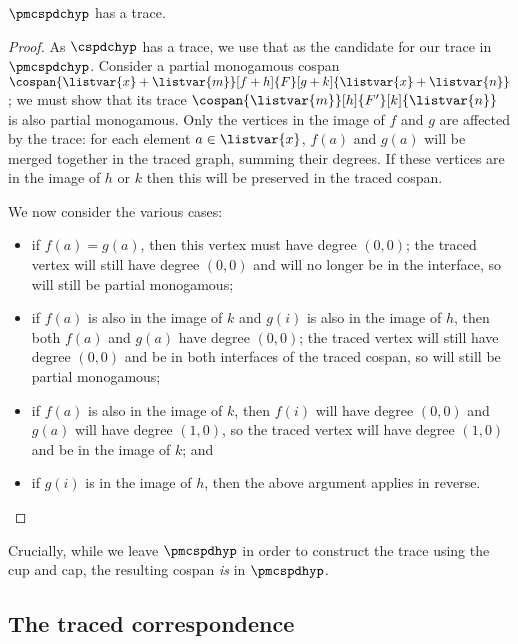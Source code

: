 \begin{theorem}
    \label{thm:partial-monogamous-ops}
    \(\pmcspdchyp\) has a trace.
\end{theorem}
\begin{proof}
    As \(\cspdchyp\) has a trace, we use that as the candidate for our trace in
    \(\pmcspdchyp\).
    Consider a partial monogamous cospan \(
        \cospan{\listvar{x} + \listvar{m}}[f + h]{F}[g + k]{\listvar{x} + \listvar{n}}
    \); we must show that its trace \(
        \cospan{\listvar{m}}[h]{F^\prime}[k]{\listvar{n}}
    \) is also partial monogamous.
    Only the vertices in the image of \(f\) and \(g\) are affected by the trace:
    for each element \(a \in \listvar{x}\), \(f(a)\) and \(g(a)\) will be merged
    together in the traced graph, summing their degrees.
    If these vertices are in the image of \(h\) or \(k\) then this will be
    preserved in the traced cospan.

    We now consider the various cases:
    \begin{itemize}
        \item if \(f(a) = g(a)\), then this vertex must have degree \((0, 0)\);
                the traced vertex will still have degree \((0, 0)\) and will no
                longer be in the interface, so will still be partial monogamous;
        \item if \(f(a)\) is also in the image of \(k\) and \(g(i)\) is also in
                the image of \(h\), then both \(f(a)\) and \(g(a)\) have degree
                \((0, 0)\); the traced vertex will still have degree
                \((0, 0)\) and be in both interfaces of the traced cospan, so
                will still be partial monogamous;
        \item if \(f(a)\) is also in the image of \(k\), then \(f(i)\) will have
                degree \((0, 0)\) and \(g(a)\) will have degree \((1,0)\), so
                the traced vertex will have degree \((1, 0)\) and be in the
                image of \(k\); and
        \item if \(g(i)\) is in the image of \(h\), then the above argument
                applies in reverse. \qedhere
    \end{itemize}
\end{proof}

Crucially, while we leave \(\pmcspdhyp\) in order to construct the trace using
the cup and cap, the resulting cospan \emph{is} in \(\pmcspdhyp\).

\subsection{The traced correspondence}

